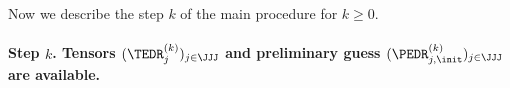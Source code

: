 %
%
%
%	
%


Now we describe the step \( k \) of the main procedure for \( k \geq 0 \).


\paragraph{Step \( k \). Tensors
\( (\TEDR_{j}^{(k)} )_{j \in \JJJ} \) and preliminary guess \( (\PEDR_{j,\init}^{(k)} )_{j \in \JJJ} \) are available.}

